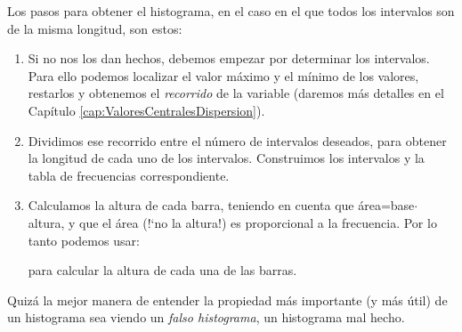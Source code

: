 Los pasos para obtener el histograma, en el caso en el que todos los intervalos son de la misma longitud, son estos:
\begin{enumerate}

      \item Si no nos los dan hechos, debemos empezar por determinar los
      intervalos.  Para ello podemos localizar el valor máximo y el mínimo de
      los valores, restarlos y obtenemos el {\em recorrido} de la variable (daremos más detalles en el Capítulo \ref{cap:ValoresCentralesDispersion}).

      \item Dividimos ese recorrido entre el número de intervalos deseados,	
      para obtener la longitud de cada uno de los intervalos. Construimos los
      intervalos y la tabla de frecuencias correspondiente.

      \item Calculamos la altura de cada barra, teniendo en cuenta que
      área=base$\cdot$ altura, y que el área ({!`}no la altura!) es proporcional a
      la frecuencia. Por lo tanto podemos usar:

        \begin{center}
        \end{center}
para calcular la altura de cada una de las barras.
\end{enumerate}
Quizá la mejor manera de entender la propiedad más importante (y más útil) de un histograma sea viendo un {\em falso histograma}, un histograma mal hecho.
